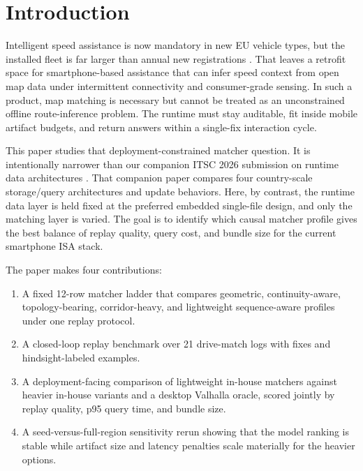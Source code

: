 \documentclass{IOS-Book-Article}
\def\hb{\hbox to 11.5 cm{}}
\begin{document}
\markboth{\hb}{\hb}

\section{Introduction}
Intelligent speed assistance is now mandatory in new EU vehicle types, but the installed fleet is far larger than annual new registrations \cite{eu2019_2144,eu2021_1958,eu_mandatory_safety_2024}. That leaves a retrofit space for smartphone-based assistance that can infer speed context from open map data under intermittent connectivity and consumer-grade sensing. In such a product, map matching is necessary but cannot be treated as an unconstrained offline route-inference problem. The runtime must stay auditable, fit inside mobile artifact budgets, and return answers within a single-fix interaction cycle.

This paper studies that deployment-constrained matcher question. It is intentionally narrower than our companion ITSC 2026 submission on runtime data architectures \cite{volz2026itsc_runtime}. That companion paper compares four country-scale storage/query architectures and update behaviors. Here, by contrast, the runtime data layer is held fixed at the preferred embedded single-file design, and only the matching layer is varied. The goal is to identify which causal matcher profile gives the best balance of replay quality, query cost, and bundle size for the current smartphone ISA stack.

The paper makes four contributions:
\begin{enumerate}
\item A fixed 12-row matcher ladder that compares geometric, continuity-aware, topology-bearing, corridor-heavy, and lightweight sequence-aware profiles under one replay protocol.
\item A closed-loop replay benchmark over 21 drive-match logs with \MatcherLadderCorpusFixes{} fixes and \MatcherLadderPseudoExamples{} hindsight-labeled examples.
\item A deployment-facing comparison of lightweight in-house matchers against heavier in-house variants and a desktop Valhalla oracle, scored jointly by replay quality, p95 query time, and bundle size.
\item A seed-versus-full-region sensitivity rerun showing that the model ranking is stable while artifact size and latency penalties scale materially for the heavier options.
\end{enumerate}
\end{document}
